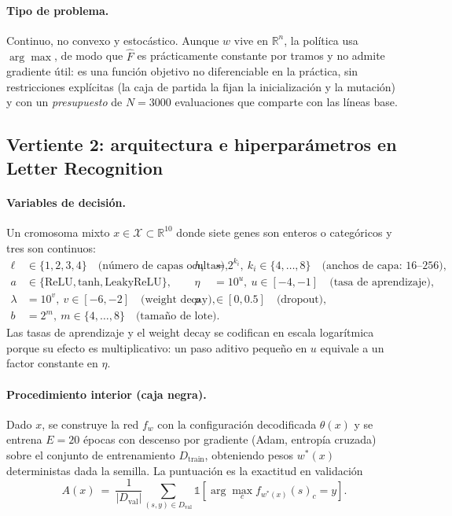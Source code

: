 \paragraph{Tipo de problema.}
Continuo, no convexo y estocástico. Aunque $w$ vive en $\mathbb{R}^n$, la política usa $\arg\max$, de modo que $\widehat{F}$ es prácticamente constante por tramos y no admite gradiente útil: es una función objetivo no diferenciable en la práctica, sin restricciones explícitas (la caja de partida la fijan la inicialización y la mutación) y con un \emph{presupuesto} de $N = 3000$ evaluaciones que comparte con las líneas base.

\subsection{Vertiente 2: arquitectura e hiperparámetros en Letter Recognition}

\paragraph{Variables de decisión.}
Un cromosoma mixto $x \in \mathcal{X} \subset \mathbb{R}^{10}$ donde siete genes son enteros o categóricos y tres son continuos:
{\small
\begin{align}
  \ell &\in \{1,2,3,4\} \quad \text{(número de capas ocultas)}, &
  h_i &= 2^{k_i}, \ k_i \in \{4,\dots,8\} \quad \text{(anchos de capa: 16--256)}, \\
  a &\in \{\text{ReLU}, \text{tanh}, \text{LeakyReLU}\}, &
  \eta &= 10^{u}, \ u \in [-4,-1] \quad \text{(tasa de aprendizaje)}, \\
  \lambda &= 10^{v}, \ v \in [-6,-2] \quad \text{(weight decay)}, &
  p &\in [0, 0.5] \quad \text{(dropout)}, \\
  b &= 2^{m}, \ m \in \{4,\dots,8\} \quad \text{(tamaño de lote)}. &&
\end{align}
}
Las tasas de aprendizaje y el weight decay se codifican en escala logarítmica porque su efecto es multiplicativo: un paso aditivo pequeño en $u$ equivale a un factor constante en $\eta$.

\paragraph{Procedimiento interior (caja negra).}
Dado $x$, se construye la red $f_{w}$ con la configuración decodificada $\theta(x)$ y se entrena $E = 20$ épocas con descenso por gradiente (Adam, entropía cruzada) sobre el conjunto de entrenamiento $D_{\text{train}}$, obteniendo pesos $w^*(x)$ deterministas dada la semilla. La puntuación es la exactitud en validación
\begin{equation}
  A(x) \ = \ \frac{1}{|D_{\text{val}}|} \sum_{(s,y) \in D_{\text{val}}} \mathbb{1}\!\left[ \arg\max_{c} f_{w^*(x)}(s)_c = y \right].
\end{equation}

